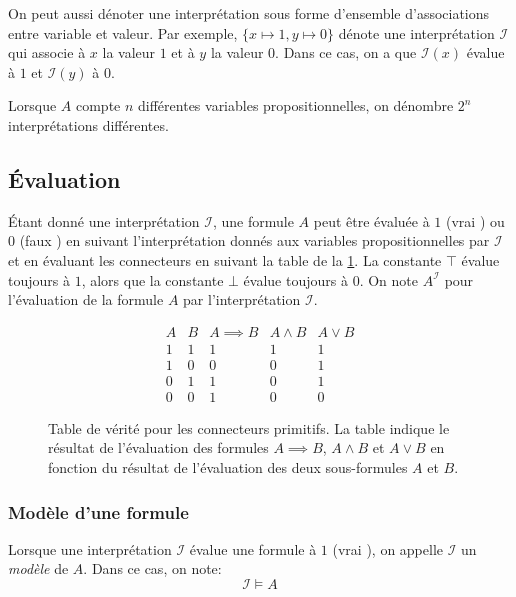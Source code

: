 On peut aussi dénoter une interprétation sous forme d'ensemble d'associations entre variable et valeur.
Par exemple, $\{ x \mapsto 1, y \mapsto 0 \}$ dénote une interprétation $\mathcal{I}$ qui associe à $x$ la valeur $1$ et à $y$ la valeur $0$. Dans ce cas, on a que $\mathcal{I}(x)$ évalue à $1$ et $\mathcal{I}(y)$ à $0$.

Lorsque $A$ compte $n$ différentes variables propositionnelles, on dénombre $2^n$ interprétations différentes.

\subsection{Évaluation}

Étant donné une interprétation $\mathcal{I}$, une formule $A$ peut être évaluée à $1$ (\og vrai \fg) ou $0$ (\og faux \fg)
en suivant l'interprétation donnés aux variables propositionnelles par $\mathcal{I}$ et
en évaluant les connecteurs en suivant la table de la \cref{fig_tables_connecteurs}.
La constante $\top$ évalue toujours à $1$, alors que la constante $\bot$ évalue toujours à $0$.
On note $A^{\mathcal{I}}$ pour l'évaluation de la formule $A$ par l'interprétation $\mathcal{I}$.

\begin{figure}[h]

\begin{displaymath}
\begin{array}{cc|ccc}
A & B & A \implies B & A \wedge B & A \vee B\\
\hline
1 & 1 & 1 & 1 & 1\\
1 & 0 & 0 & 0 & 1\\
0 & 1 & 1 & 0 & 1\\
0 & 0 & 1 & 0 & 0
\end{array}
\end{displaymath}

\caption{Table de vérité pour les connecteurs primitifs. La table indique le résultat de l'évaluation des formules $A \implies B$, $A \wedge B$ et $A \vee B$ en fonction du résultat de l'évaluation des deux sous-formules $A$ et $B$.}
\label{fig_tables_connecteurs}
\end{figure}

\subsubsection{Modèle d'une formule}

Lorsque une interprétation $\mathcal{I}$ évalue une formule à $1$ (\og vrai \fg), on appelle $\mathcal{I}$ un \textit{modèle} de $A$.
Dans ce cas, on note:
\[
\mathcal{I} \vDash A
\]


